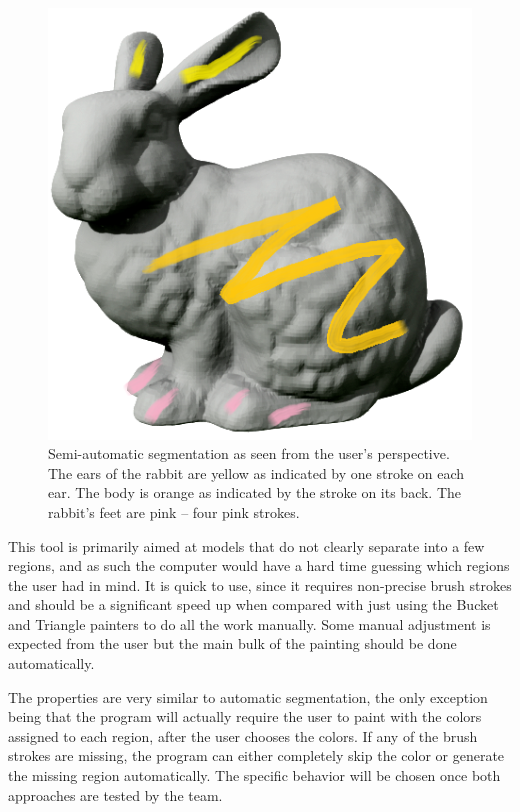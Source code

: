 \begin{figure}
	\centering
	\includegraphics[scale=0.75]{images/rabbit.png}
	\caption{Semi-automatic segmentation as seen from the user's perspective. The ears of the rabbit are yellow as indicated by one stroke on each ear. The body is orange as indicated by the stroke on its back. The rabbit's feet are pink -- four pink strokes.}
	\label{fig:rabbit}
\end{figure}

This tool is primarily aimed at models that do not clearly separate into a few regions, and as such the computer would have a hard time guessing which regions the user had in mind. It is quick to use, since it requires non-precise brush strokes and should be a significant speed up when compared with just using the Bucket and Triangle painters to do all the work manually. Some manual adjustment is expected from the user but the main bulk of the painting should be done automatically.

The properties are very similar to automatic segmentation, the only exception being that the program will actually require the user to paint with the colors assigned to each region, after the user chooses the colors. If any of the brush strokes are missing, the program can either completely skip the color or generate the missing region automatically. The specific behavior will be chosen once both approaches are tested by the team.

